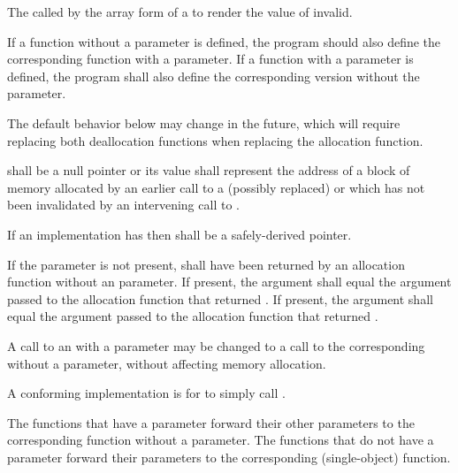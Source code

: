 \begin{itemdescr}
\pnum
\effects
The
called by the array form of a
to render the value of  invalid.

\pnum
\replaceable
{}
If a function without a  parameter is defined,
the program should also define
the corresponding function with a  parameter.
If a function with a  parameter is defined,
the program shall also define
the corresponding version without the  parameter.
\begin{note}
The default behavior below may change in the future, which will require
replacing both deallocation functions when replacing the allocation function.
\end{note}

\pnum
\requires
{} shall be a null pointer or
its value shall represent the address of
a block of memory allocated by
an earlier call to a (possibly replaced)
or
which has not been invalidated by an intervening call to
.

\pnum
\requires
If an implementation has 
then  shall be a safely-derived pointer.

\pnum
\requires
If the  parameter is not present,
 shall have been returned by an allocation function
without an  parameter.
If present, the  argument
shall equal the  argument
passed to the allocation function that returned .
If present, the  argument
shall equal the  argument
passed to the allocation function that returned .

\pnum
\required
A call to an 
with a  parameter
may be changed to
a call to the corresponding 
without a  parameter,
without affecting memory allocation.
\begin{note} A conforming implementation is for
 to simply call
. \end{note}

\pnum
{}
The functions that have a  parameter
forward their other parameters
to the corresponding function without a  parameter.
The functions that do not have a  parameter
forward their parameters
to the corresponding  (single-object) function.
\end{itemdescr}

